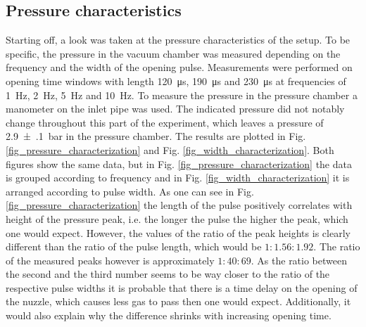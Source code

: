 \documentclass[a4paper,10pt]{article}
\begin{document}
\subsection{Pressure characteristics}
Starting off, a look was taken at the pressure characteristics of the setup. To be specific, the pressure in the vacuum chamber was measured depending on the frequency and the width of the opening pulse. Measurements were performed on opening time windows with length \SI{120}{\micro \s}, \SI{190}{\micro \s} and \SI{230}{\micro \s} at frequencies of \SI{1}{\hertz}, \SI{2}{\hertz}, \SI{5}{\hertz} and \SI{10}{\hertz}. To measure the pressure in the pressure chamber a manometer on the inlet pipe was used. The indicated pressure did not notably change throughout this part of the experiment, which leaves a pressure of \SI{2.9(1)}{\bar} in the pressure chamber. The results are plotted in Fig. \ref{fig_pressure_characterization} and Fig. \ref{fig_width_characterization}. Both figures show the same data, but in Fig. \ref{fig_pressure_characterization} the data is grouped according to frequency and in Fig. \ref{fig_width_characterization} it is arranged according to pulse width. As one can see in Fig. \ref{fig_pressure_characterization} the length of the pulse positively correlates with height of the pressure peak, i.e. the longer the pulse the higher the peak, which one would expect. However, the values of the ratio of the peak heights is clearly different than the ratio of the pulse length, which would be $1:1.56:1.92$. The ratio of the measured peaks however is approximately $1:40:69$. As the ratio between the second and the third number seems to be way closer to the ratio of the respective pulse widths it is probable that there is a time delay on the opening of the nuzzle, which causes less gas to pass then one would expect. Additionally, it would also explain why the difference shrinks with increasing opening time. 
\end{document}
